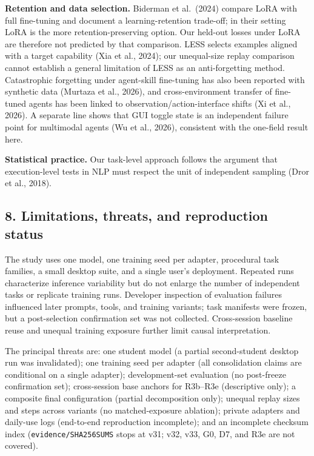 \documentclass[
  10pt,
]{article}
\begin{document}
\textbf{Retention and data selection.} Biderman et al.~(2024) compare
LoRA with full fine-tuning and document a learning-retention trade-off;
in their setting LoRA is the more retention-preserving option. Our
held-out losses under LoRA are therefore not predicted by that
comparison. LESS selects examples aligned with a target capability (Xia
et al., 2024); our unequal-size replay comparison cannot establish a
general limitation of LESS as an anti-forgetting method. Catastrophic
forgetting under agent-skill fine-tuning has also been reported with
synthetic data (Murtaza et al., 2026), and cross-environment transfer of
fine-tuned agents has been linked to observation/action-interface shifts
(Xi et al., 2026). A separate line shows that GUI toggle state is an
independent failure point for multimodal agents (Wu et al., 2026),
consistent with the one-field result here.

\textbf{Statistical practice.} Our task-level approach follows the
argument that execution-level tests in NLP must respect the unit of
independent sampling (Dror et al., 2018).

\subsection{8. Limitations, threats, and reproduction
status}\label{limitations-threats-and-reproduction-status}

The study uses one model, one training seed per adapter, procedural task
families, a small desktop suite, and a single user's deployment.
Repeated runs characterize inference variability but do not enlarge the
number of independent tasks or replicate training runs. Developer
inspection of evaluation failures influenced later prompts, tools, and
training variants; task manifests were frozen, but a post-selection
confirmation set was not collected. Cross-session baseline reuse and
unequal training exposure further limit causal interpretation.

The principal threats are: one student model (a partial second-student
desktop run was invalidated); one training seed per adapter (all
consolidation claims are conditional on a single adapter);
development-set evaluation (no post-freeze confirmation set);
cross-session base anchors for R3b--R3e (descriptive only); a composite
final configuration (partial decomposition only); unequal replay sizes
and steps across variants (no matched-exposure ablation); private
adapters and daily-use logs (end-to-end reproduction incomplete); and an
incomplete checksum index (\texttt{evidence/SHA256SUMS} stops at v31;
v32, v33, G0, D7, and R3e are not covered).
\end{document}
